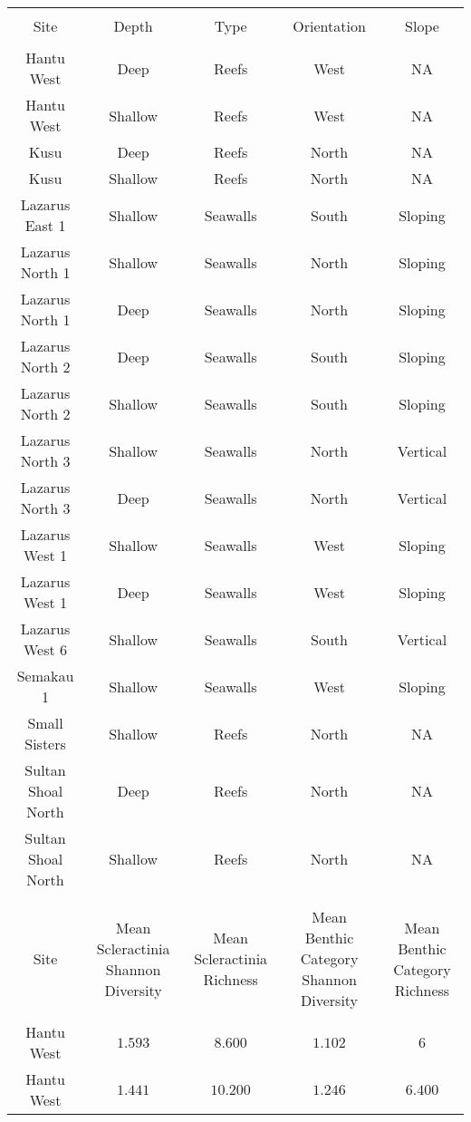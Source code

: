 \documentclass[fontsize = 16pt]{article}
\begin{document}
\begin{table}[!htbp] \centering 
  \caption*{} 
  \label{} 
\begin{tabular}{@{\extracolsep{5pt}} ccccc} 
\\[-1.8ex]\hline 
\hline \\[-1.8ex] 
Site & Depth & Type & Orientation & Slope  \\ 
\hline \\[-1.8ex] 
Hantu West & Deep & Reefs & West & NA  \\ 
Hantu West & Shallow & Reefs & West & NA \\ 
Kusu & Deep & Reefs & North & NA  \\ 
Kusu & Shallow & Reefs & North & NA \\ 
Lazarus East 1 & Shallow & Seawalls & South & Sloping  \\ 
Lazarus North 1 & Shallow & Seawalls & North & Sloping\\ 
Lazarus North 1 & Deep & Seawalls & North & Sloping  \\ 
Lazarus North 2 & Deep & Seawalls & South & Sloping\\ 
Lazarus North 2 & Shallow & Seawalls & South & Sloping \\ 
Lazarus North 3 & Shallow & Seawalls & North & Vertical \\ 
Lazarus North 3 & Deep & Seawalls & North & Vertical  \\ 
Lazarus West 1 & Shallow & Seawalls & West & Sloping\\ 
Lazarus West 1 & Deep & Seawalls & West & Sloping \\ 
Lazarus West 6 & Shallow & Seawalls & South & Vertical\\ 
Semakau 1 & Shallow & Seawalls & West & Sloping  \\ 
Small Sisters & Shallow & Reefs & North & NA \\ 
Sultan Shoal North & Deep & Reefs & North & NA \\ 
Sultan Shoal North & Shallow & Reefs & North & NA\\ 
\\[-1.8ex]\hline 
\hline \\[-1.8ex] 
Site & Mean Scleractinia Shannon Diversity & Mean Scleractinia Richness & Mean Benthic Category Shannon Diversity & Mean Benthic Category Richness\\
\hline \\[-1.8ex] 
Hantu West  & $1.593$ & $8.600$ & $1.102$ & $6$ \\ 
Hantu West & $1.441$ & $10.200$ & $1.246$ & $6.400$ \\ 

\end{tabular}
\end{table}
\end{document}
